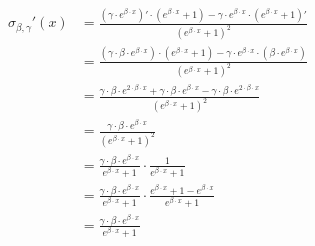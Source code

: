 \documentclass[titlepage]{article}
\begin{document}
          \begin{align*}
            \sigma_{\beta, \gamma}' (x)
              & = \frac{
                    \left( \gamma \cdot e^{\beta \cdot x} \right)'
                    \cdot
                    \left(e^{\beta \cdot x} + 1 \right)
                    -
                    \gamma
                    \cdot
                    e^{\beta \cdot x}
                    \cdot
                    \left(e^{\beta \cdot x} + 1 \right)'
                  }{
                    \left(e^{\beta \cdot x} + 1 \right)^2
                  } \\
              & = \frac{
                    \left( \gamma \cdot \beta \cdot e^{\beta \cdot x} \right)
                    \cdot
                    \left(e^{\beta \cdot x} + 1 \right)
                    -
                    \gamma
                    \cdot
                    e^{\beta \cdot x}
                    \cdot
                    \left( \beta \cdot e^{\beta \cdot x} \right)
                  }{
                    \left(e^{\beta \cdot x} + 1 \right)^2
                  } \\
              & = \frac{
                    \gamma \cdot \beta \cdot e^{2 \cdot \beta \cdot x}
                    +
                    \gamma \cdot \beta \cdot e^{\beta \cdot x}
                    -
                    \gamma \cdot \beta \cdot e^{2 \cdot \beta \cdot x}
                  }{
                    \left(e^{\beta \cdot x} + 1 \right)^2
                  } \\
              & = \frac{
                    \gamma \cdot \beta \cdot e^{\beta \cdot x}
                  }{
                    \left(e^{\beta \cdot x} + 1 \right)^2
                  } \\
              & = \frac{
                    \gamma \cdot \beta \cdot e^{\beta \cdot x}
                  }{
                    e^{\beta \cdot x} + 1
                  }
                  \cdot
                  \frac{1}{e^{\beta \cdot x} + 1} \\
              & = \frac{
                    \gamma \cdot \beta \cdot e^{\beta \cdot x}
                  }{
                    e^{\beta \cdot x} + 1
                  }
                  \cdot
                  \frac{
                    e^{\beta \cdot x} + 1 - e^{\beta \cdot x}
                  }{
                    e^{\beta \cdot x} + 1
                  } \\
              & = \frac{
                    \gamma \cdot \beta \cdot e^{\beta \cdot x}
                  }{
                    e^{\beta \cdot x} + 1
}
\end{align*}
\end{document}
